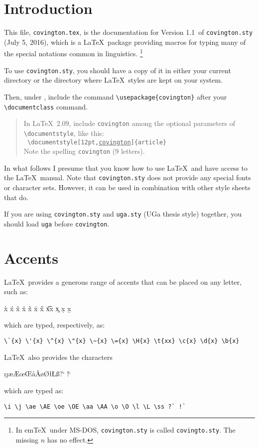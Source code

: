 \documentclass{article}
\def\pversion{Version 1.1}
\def\pdate{July 5, 2016}
\begin{document}
\section*{Introduction}
This file, \texttt{covington.tex}, is the documentation for \pversion\
of \texttt{covington.sty} (\pdate), which is a \LaTeX\ package providing macros
for typing many of the special notations common in linguistics.%
\footnote{In em\TeX\ under MS-DOS, \texttt{covington.sty} is called \texttt{covingto.sty}.
The missing $n$ has no effect.}

To use \texttt{covington.sty}, you should have a copy of it in either your
current directory or the directory where \LaTeX\ styles are kept on your 
system.

Then, under \LaTeXe, include the command
\verb"\usepackage{covington}"
after your \verb"\documentclass" command.

\begin{quote}
\footnotesize
In \LaTeX\ 2.09,
include \texttt{covington} among the optional parameters of 
\verb"\documentstyle", like this: \hfill\\
{\tt
\verb"\documentstyle[12pt,"\underline{covington}\verb"]{article}"
}\hfill\\
Note the spelling \texttt{covington} (9 letters).
\end{quote}

In what follows I presume that you know how to use \LaTeX\ and have 
access to the \LaTeX\ manual. Note that \texttt{covington.sty} does not 
provide any special fonts or character sets.  However, it can be used in 
combination with other style sheets that do.

If you are using \texttt{covington.sty} and \texttt{uga.sty} (UGa thesis style) 
together, you should load \texttt{uga} before \texttt{covington}.

 
\section{Accents}

\LaTeX\ provides a generous range of accents that can be placed on any
letter, such as:
\begin{flushleft}
\`{x} \'{x} \^{x} \"{x} \~{x} \={x} \H{x} \t{xx} \c{x} \d{x} \b{x}
\end{flushleft}
which are typed, respectively, as:
\begin{verbatim}
\`{x} \'{x} \^{x} \"{x} \~{x} \={x} \H{x} \t{xx} \c{x} \d{x} \b{x}
\end{verbatim}
\LaTeX\ also provides the characters
\begin{flushleft}\obeyspaces
\i \j \ae \AE \oe \OE \aa \AA \o \O \l \L \ss ?` !`
\end{flushleft}
which are typed as:
\begin{verbatim}
\i \j \ae \AE \oe \OE \aa \AA \o \O \l \L \ss ?` !`
\end{verbatim}
\end{document}
